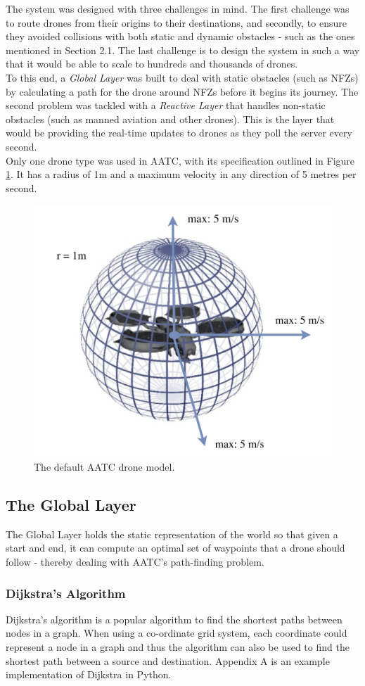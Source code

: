 \documentclass[a4paper,12pt,titlepage]{article}
\begin{document}
The system was designed with three challenges in mind. The first challenge was to route drones from their origins to their destinations, and secondly, to ensure they avoided collisions with both static and dynamic obstacles - such as the ones mentioned in Section 2.1. The last challenge is to design the system in such a way that it would be able to scale to hundreds and thousands of drones. \\

To this end, a \textit{Global Layer} was built to deal with static obstacles (such as NFZs) by calculating a path for the drone around NFZs before it begins its journey. The second problem was tackled with a \textit{Reactive Layer} that handles non-static obstacles (such as manned aviation and other drones). This is the layer that would be providing the real-time updates to drones as they poll the server every second. \\

Only one drone type was used in AATC, with its specification outlined in Figure \ref{fig:edrone}. It has a radius of 1m and a maximum velocity in any direction of 5 metres per second.

\begin{figure}[!hbpt]
  \center
  \includegraphics[width=0.4\linewidth]{img/edrone.jpg}
  \caption{The default AATC drone model. \cite{Balaji2017}}
  \label{fig:edrone}
\end{figure}

\subsection{The Global Layer}
The Global Layer holds the static representation of the world so that given a start and end, it can compute an optimal set of waypoints that a drone should follow - thereby dealing with AATC's path-finding problem.

\subsubsection{Dijkstra's Algorithm}
Dijkstra's algorithm is a popular algorithm to find the shortest paths between nodes in a graph. When using a co-ordinate grid system, each coordinate could represent a node in a graph and thus the algorithm can also be used to find the shortest path between a source and destination. Appendix A is an example implementation of Dijkstra in Python. \\
\end{document}
